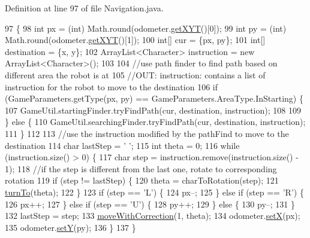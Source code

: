 Definition at line 97 of file Navigation.\+java.


\begin{DoxyCode}
97                                                                   \{
98     \textcolor{keywordtype}{int} px = (int) Math.round(odometer.\hyperlink{classca_1_1mcgill_1_1ecse211_1_1odometer_1_1_odometer_data_a8f40f0264c68f0cbed4fff1723ae7863}{getXYT}()[0]);
99     \textcolor{keywordtype}{int} py = (int) Math.round(odometer.\hyperlink{classca_1_1mcgill_1_1ecse211_1_1odometer_1_1_odometer_data_a8f40f0264c68f0cbed4fff1723ae7863}{getXYT}()[1]);
100     \textcolor{keywordtype}{int}[] cur = \{px, py\};
101     \textcolor{keywordtype}{int}[] destination = \{x, y\};
102     ArrayList<Character> instruction = \textcolor{keyword}{new} ArrayList<Character>();
103     
104     \textcolor{comment}{//use path finder to find path based on different area the robot is at}
105     \textcolor{comment}{//OUT: instruction: contains a list of instruction for the robot to move to the destination}
106     \textcolor{keywordflow}{if} (GameParameters.getType(px, py) == GameParameters.AreaType.InStarting) \{
107       GameUtil.startingFinder.tryFindPath(cur, destination, instruction);
108       
109     \} \textcolor{keywordflow}{else} \{
110       GameUtil.searchingFinder.tryFindPath(cur, destination, instruction);
111     \}
112     
113     \textcolor{comment}{//use the instruction modified by the pathFind to move to the destination}
114     \textcolor{keywordtype}{char} lastStep = \textcolor{charliteral}{' '};
115     \textcolor{keywordtype}{int} theta = 0;
116     \textcolor{keywordflow}{while} (instruction.size() > 0) \{
117       \textcolor{keywordtype}{char} step = instruction.remove(instruction.size() - 1);
118       \textcolor{comment}{//if the step is different from the last one, rotate to corresponding rotation}
119       \textcolor{keywordflow}{if} (step != lastStep) \{
120         theta = charToRotation(step);
121         \hyperlink{classca_1_1mcgill_1_1ecse211_1_1project_1_1_navigation_a3bbe0645f2b3b3d0986b4a707fb5a00c}{turnTo}(theta);
122       \}
123       \textcolor{keywordflow}{if} (step == \textcolor{charliteral}{'L'}) \{
124         px--;
125       \} \textcolor{keywordflow}{else} \textcolor{keywordflow}{if} (step == \textcolor{charliteral}{'R'}) \{
126         px++;
127       \} \textcolor{keywordflow}{else} \textcolor{keywordflow}{if} (step == \textcolor{charliteral}{'U'}) \{
128         py++;
129       \} \textcolor{keywordflow}{else} \{
130         py--;
131       \}
132       lastStep = step;
133       \hyperlink{classca_1_1mcgill_1_1ecse211_1_1project_1_1_navigation_a48eeb9ae2da23664421e8da5642054c7}{moveWithCorrection}(1, theta);
134       odometer.\hyperlink{classca_1_1mcgill_1_1ecse211_1_1odometer_1_1_odometer_data_a2911d7215e47f3064defe016b46bfeef}{setX}(px);
135       odometer.\hyperlink{classca_1_1mcgill_1_1ecse211_1_1odometer_1_1_odometer_data_a82986438cd462e66520bc62bb4bd2b75}{setY}(py);
136     \}
137   \}
\end{DoxyCode}
